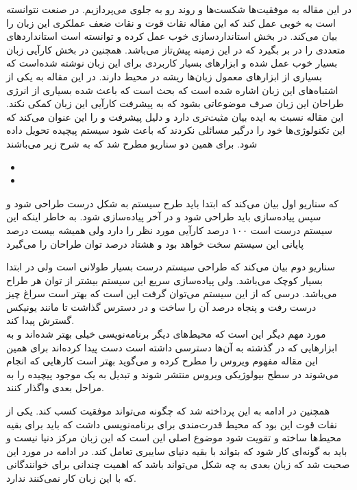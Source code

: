 \documentclass[a4paper, 12pt]{article}
\title{\lr{Lisp: Good News, Bad News, How to Win Big}}
\author{حسین افکار}
\begin{document}
\maketitle
در این مقاله به موفقیت‌ها شکست‌ها و روند رو به جلوی می‌پردازیم. در صنعت
نتوانسته است به خوبی عمل کند که این مقاله نقات قوت و نقات ضعف عملکری این زبان را بیان می‌کند.
در بخش استانداردسازی خوب عمل کرده و توانسته است استاندارد‌های متعددی را در بر بگیرد که
در این زمینه پیش‌تاز می‌باشد. همچنین در بخش کارآیی زبان بسیار خوب عمل شده و ابزار‌های بسیار
کاربردی برای این زبان نوشته شده‌است که بسیاری از ابزار‌های معمول زبان‌ها ریشه در محیط
دارند.
در این مقاله به یکی از اشتباه‌های این زبان اشاره شده است که بحث
است که باعث شده بسیاری از انرژی طراحان این زبان صرف موضوعاتی بشود که به پیشرفت کارآیی
این زبان کمکی نکند.
این مقاله نسبت به ایده
بیان مثبت‌تری دارد و دلیل پیشرفت
و
را این عنوان می‌کند که این تکنولوژی‌ها خود را درگیر مسائلی نکردند که باعث شود سیستم پیچیده
تحویل داده شود.
برای همین دو سناریو مطرح شد که به شرح زیر می‌باشند

\begin{itemize}
    \item {}
    \item {}
\end{itemize}

که سناریو اول بیان می‌کند که ابتدا باید طرح سیستم به شکل درست طراحی شود و سپس
پیاده‌سازی باید طراحی شود و در آخر پیاده‌سازی شود.
به خاطر اینکه این سیستم درست است ۱۰۰ درصد کارآیی مورد نظر را دارد ولی همیشه بیست درصد
پایانی این سیستم سخت خواهد بود و هشتاد درصد توان طراحان را می‌گیرد

سناریو دوم بیان می‌کند که طراحی سیستم درست بسیار طولانی است ولی در ابتدا بسیار کوچک
می‌باشد. ولی پیاده‌سازی سریع این سیستم بیشتر از توان هر طراح می‌باشد.
درسی که از این سیستم می‌توان گرفت این است که بهتر است سراغ چیز درست رفت و پنجاه درصد
آن را ساخت و در دسترس گذاشت تا مانند یونیکس گسترش پیدا کند. \\

مورد مهم دیگر این است که محیط‌های دیگر برنامه‌نویسی خیلی بهتر شده‌اند و به ابزار‌هایی که
در گذشته به آن‌ها دسترسی داشته است دست پیدا کرده‌اند
برای همین این مقاله مفهوم ویروس را مطرح کرده و می‌گوید بهتر است کار‌هایی که انجام می‌شوند
در سطح بیولوژیکی ویروس منتشر شوند و تبدیل به یک موجود پیچیده را به مراحل بعدی واگذار کنند.

همچنین در ادامه به این پرداخته شد که چگونه
می‌تواند موفقیت کسب کند.
یکی از نقات قوت
این بود که محیط قدرت‌مندی برای برنامه‌نویسی داشت که باید برای بقیه محیط‌ها ساخته و تقویت شود
موضوع اصلی این است که این زبان مرکز دنیا نیست و باید به گونه‌ای کار شود که بتواند با بقیه دنیای
سایبری تعامل کند.
در ادامه در مورد این صحبت شد که زبان بعدی به چه شکل می‌تواند باشد که اهمیت چندانی برای
خوانندگانی که با این زبان کار نمی‌کنند ندارد. \\
\end{document}

